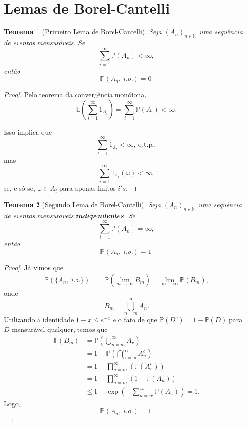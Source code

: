 \documentclass[12pt,a4paper,oneside]{book}
\newtheorem{theorem}{Teorema}[section]
\theoremstyle{definition}
\theoremstyle{remark}
\numberwithin{equation}{section}
\newcommand{\N}{\mathbb{N}}
\newcommand{\E}{\mathbb{E}}
\newcommand{\pr}{\mathbb{P}}
\begin{document}
\newpage
\section{Lemas de Borel-Cantelli}

\begin{tcolorbox}

\begin{theorem}[Primeiro Lema de Borel-Cantelli] Seja $(A_n)_{n\in \N}$ uma sequência de eventos mensuráveis. Se
$$\sum_{i=1}^\infty\pr(A_n)<\infty, $$
então
$$\pr(A_n,\ i.o.)=0. $$

\end{theorem}

\end{tcolorbox}
\begin{proof}
Pelo teorema da convergência monótona,
$$ \E\left(\sum^\infty_{i=1} 1_{A_i}\right) =\sum^\infty_{i=1} \pr(A_i)<\infty.  $$

Isso implica que 
$$\sum^\infty_{i=1}1_{A_i}<\infty,\ \textrm{q.t.p.}, $$
mas 
$$\sum^\infty_{i=1}1_{A_i}(\omega) <\infty, $$
se, e só se, $\omega\in A_i$ para apenas finitos $i's$.
\end{proof}

\begin{tcolorbox}

\begin{theorem}[Segundo Lema de Borel-Cantelli] Seja $(A_n)_{n\in \N}$ uma sequência de eventos mensuráveis \textbf{independentes}. Se
$$\sum_{i=1}^\infty\pr(A_n)=\infty, $$
então
$$\pr(A_n,\ i.o.)=1. $$

\end{theorem}

\end{tcolorbox} 
\begin{proof}
Já vimos que
\begin{align*}
\pr(\{A_n,\ i.o.\}) & = \pr(\lim_{m\rightarrow \infty} B_m) = \lim_{m\rightarrow \infty} \pr(B_m),
\end{align*}
onde 
$$B_m = \bigcup_{n=m}^\infty  A_n.$$
Utilizando a identidade $1-x\leq e^{-x}$ e o fato de que $\pr(D^c) = 1-\pr(D)$ para $D$ mensurável qualquer, temos que
\begin{align*}
\pr(B_m)& = \pr(\bigcup_{n=m}^\infty  A_n)  \\
&=1-  \pr(\bigcap_{n=m}^\infty  A_n^c)\\
& = 1-\prod_{n=m}^\infty(\pr(A_n^c)) \\
& = 1-\prod_{n=m}^\infty(1-\pr(A_n)) \\
&\leq 1- \exp(-\sum_{n=m}^\infty \pr(A_n)) = 1. 
\end{align*}
Logo,
$$\pr(A_n,\ i.o.)=1. $$
\end{proof}
\end{document}
